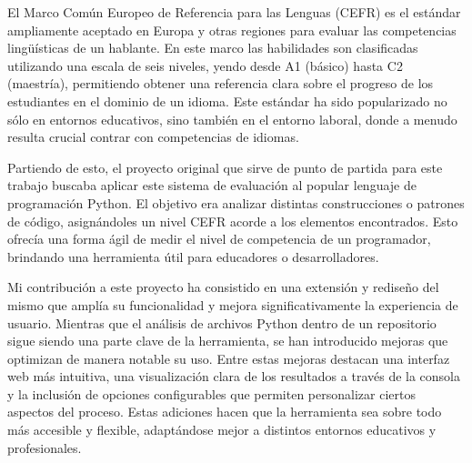 \documentclass[a4paper, 12pt]{book}
\begin{document}




El Marco Común Europeo de Referencia para las Lenguas (CEFR) es el estándar ampliamente aceptado en Europa y otras regiones para evaluar las competencias lingüísticas de un hablante. En este marco las habilidades son clasificadas utilizando una escala de seis niveles, yendo desde A1 (básico) hasta C2 (maestría), permitiendo obtener una referencia clara sobre el progreso de los estudiantes en el dominio de un idioma. Este estándar ha sido popularizado no sólo en entornos educativos, sino también en el entorno laboral, donde a menudo resulta crucial contrar con competencias de idiomas.

Partiendo de esto, el proyecto original que sirve de punto de partida para este trabajo buscaba aplicar este sistema de evaluación al popular lenguaje de programación Python. El objetivo era analizar  distintas construcciones o patrones de código, asignándoles un nivel CEFR acorde a los elementos encontrados. Esto ofrecía una forma ágil de medir el nivel de competencia de un programador, brindando una herramienta útil para educadores o desarrolladores.

Mi contribución a este proyecto ha consistido en una extensión y rediseño del mismo que amplía su funcionalidad y mejora significativamente la experiencia de usuario. Mientras que el análisis de archivos Python dentro de un repositorio sigue siendo una parte clave de la herramienta, se han introducido mejoras que optimizan de manera notable su uso. Entre estas mejoras destacan una interfaz web más intuitiva, una visualización clara de los resultados a través de la consola y la inclusión de opciones configurables que permiten personalizar ciertos aspectos del proceso. Estas adiciones hacen que la herramienta sea sobre todo más accesible y flexible, adaptándose mejor a distintos entornos educativos y profesionales.
\end{document}
